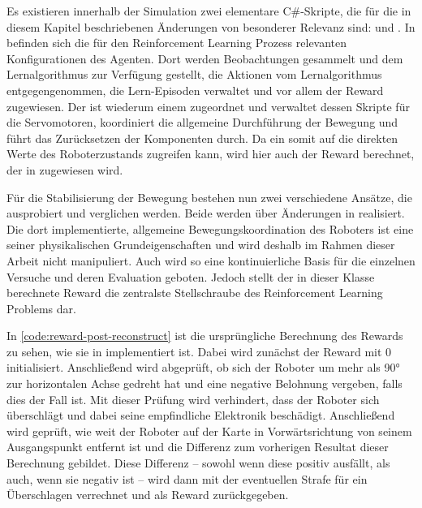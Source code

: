 Es existieren innerhalb der Simulation zwei elementare C\#-Skripte, die für die in diesem Kapitel beschriebenen Änderungen von besonderer Relevanz sind:  und .
In  befinden sich die für den Reinforcement Learning Prozess relevanten Konfigurationen des Agenten.
Dort werden Beobachtungen gesammelt und dem Lernalgorithmus zur Verfügung gestellt, die Aktionen vom Lernalgorithmus entgegengenommen, die Lern-Episoden verwaltet und vor allem der Reward zugewiesen.
Der  ist wiederum einem  zugeordnet und verwaltet dessen Skripte für die Servomotoren, koordiniert die allgemeine Durchführung der Bewegung und führt das Zurücksetzen der Komponenten durch.
Da ein  somit auf die direkten Werte des Roboterzustands zugreifen kann, wird hier auch der Reward berechnet, der in  zugewiesen wird.

Für die Stabilisierung der Bewegung bestehen nun zwei verschiedene Ansätze, die ausprobiert und verglichen werden.
Beide werden über Änderungen in  realisiert.
Die dort implementierte, allgemeine Bewegungskoordination des Roboters ist eine seiner physikalischen Grundeigenschaften und wird deshalb im Rahmen dieser Arbeit nicht manipuliert.
Auch wird so eine kontinuierliche Basis für die einzelnen Versuche und deren Evaluation geboten.
Jedoch stellt der in dieser Klasse berechnete Reward die zentralste Stellschraube des Reinforcement Learning Problems dar.

\begin{figure}
    
\end{figure}

In \autoref{code:reward-post-reconstruct} ist die ursprüngliche Berechnung des Rewards zu sehen, wie sie in  implementiert ist.
Dabei wird zunächst der Reward mit 0 initialisiert.
Anschließend wird abgeprüft, ob sich der Roboter um mehr als 90° zur horizontalen Achse gedreht hat und eine negative Belohnung vergeben, falls dies der Fall ist.
Mit dieser Prüfung wird verhindert, dass der Roboter sich überschlägt und dabei seine empfindliche Elektronik beschädigt.
Anschließend wird geprüft, wie weit der Roboter auf der Karte in Vorwärtsrichtung von seinem Ausgangspunkt entfernt ist und die Differenz zum vorherigen Resultat dieser Berechnung gebildet.
Diese Differenz -- sowohl wenn diese positiv ausfällt, als auch, wenn sie negativ ist -- wird dann mit der eventuellen Strafe für ein Überschlagen verrechnet und als Reward zurückgegeben.

